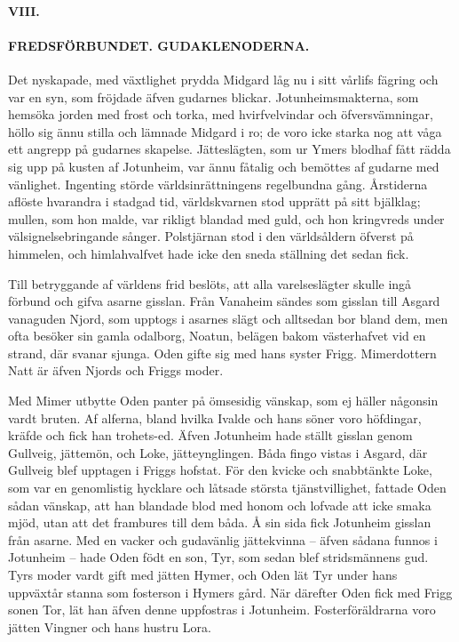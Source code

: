 \paragraph{VIII.}

\paragraph{FREDSFÖRBUNDET. GUDAKLENODERNA.}

Det nyskapade, med växtlighet prydda Midgard låg nu i sitt vårlifs
fägring och var en syn, som fröjdade äfven gudarnes blickar.
Jotunheimsmakterna, som hemsöka jorden med frost och torka, med
hvirfvelvindar och öfversvämningar, höllo sig ännu stilla och lämnade
Midgard i ro; de voro icke starka nog att våga ett angrepp på gudarnes
skapelse. Jätteslägten, som ur Ymers blodhaf fått rädda sig upp på
kusten af Jotunheim, var ännu fåtalig och bemöttes af gudarne med
vänlighet. Ingenting störde världsinrättningens regelbundna gång.
Årstiderna aflöste hvarandra i stadgad tid, världskvarnen stod upprätt
på sitt bjälklag; mullen, som hon malde, var rikligt blandad med guld,
och hon kringvreds under välsignelsebringande sånger. Polstjärnan stod i
den världsåldern öfverst på himmelen, och himlahvalfvet hade icke den
sneda ställning det sedan fick.

Till betryggande af världens frid beslöts, att alla varelseslägter
skulle ingå förbund och gifva asarne gisslan. Från Vanaheim sändes som
gisslan till Asgard vanaguden Njord, som upptogs i asarnes slägt och
alltsedan bor bland dem, men ofta besöker sin gamla odalborg, Noatun,
belägen bakom västerhafvet vid en strand, där svanar sjunga. Oden gifte
sig med hans syster Frigg. Mimerdottern Natt är äfven Njords och Friggs
moder.

\protect\hypertarget{lb1625905.xhtmlux5cux23start17}{}{}\protect\hypertarget{lb1625905.xhtmlux5cux23start17-a}{}{}\protect\hypertarget{lb1625905.xhtmlux5cux23start17-b}{}{}\protect\hypertarget{lb1625905.xhtmlux5cux23start17-c}{}{}\protect\hypertarget{lb1625905.xhtmlux5cux23start17-d}{}{}

Med Mimer utbytte Oden panter på ömsesidig vänskap, som ej häller
någonsin vardt bruten. Af alferna, bland hvilka Ivalde och hans söner
voro höfdingar, kräfde och fick han trohets-ed. Äfven Jotunheim hade
ställt gisslan genom Gullveig, jättemön, och Loke, jätteynglingen. Båda
fingo vistas i Asgard, där Gullveig blef upptagen i Friggs hofstat. För
den kvicke och snabbtänkte Loke, som var en genomlistig hycklare och
låtsade största tjänstvillighet, fattade Oden sådan vänskap, att han
blandade blod med honom och lofvade att icke smaka mjöd, utan att det
frambures till dem båda. Å sin sida fick Jotunheim gisslan från asarne.
Med en vacker och gudavänlig jättekvinna -- äfven sådana funnos i
Jotunheim -- hade Oden födt en son, Tyr, som sedan blef stridsmännens
gud. Tyrs moder vardt gift med jätten Hymer, och Oden lät Tyr under hans
uppväxtår stanna som fosterson i Hymers gård. När därefter Oden fick med
Frigg sonen Tor, lät han äfven denne uppfostras i Jotunheim.
Fosterföräldrarna voro jätten Vingner och hans hustru Lora.

